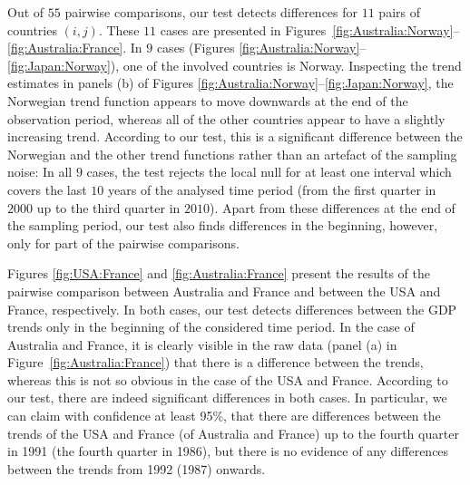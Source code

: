 \documentclass[a4paper,12pt]{article}
\begin{document}
Out of $55$ pairwise comparisons, our test detects differences for $11$ pairs of countries $(i,j)$. These $11$ cases are presented in Figures~\ref{fig:Australia:Norway}--\ref{fig:Australia:France}. In $9$ cases (Figures \ref{fig:Australia:Norway}--\ref{fig:Japan:Norway}), one of the involved countries is Norway. Inspecting the trend estimates in panels (b) of Figures \ref{fig:Australia:Norway}--\ref{fig:Japan:Norway}, the Norwegian trend function appears to move downwards at the end of the observation period, whereas all of the other countries appear to have a slightly increasing trend. According to our test, this is a significant difference between the Norwegian and the other trend functions rather than an artefact of the sampling noise: In all $9$ cases, the test rejects the local null for at least one interval which covers the last $10$ years of the analysed time period (from the first quarter in $2000$ up to the third quarter in $2010$). Apart from these differences at the end of the sampling period, our test also finds differences in the beginning, however, only for part of the pairwise comparisons. 




Figures \ref{fig:USA:France} and \ref{fig:Australia:France} present the results of the pairwise comparison between Australia and France and between the USA and France, respectively. In both cases, our test detects differences between the GDP trends only in the beginning of the considered time period. In the case of Australia and France, it is clearly visible in the raw data (panel (a) in Figure~\ref{fig:Australia:France}) that there is a difference between the trends, whereas this is not so obvious in the case of the USA and France. According to our test, there are indeed significant differences in both cases. In particular, we can claim with confidence at least 95\%, that there are differences between the trends of the USA and France (of Australia and France) up to the fourth quarter in 1991 (the fourth quarter in 1986), but there is no evidence of any differences between the trends from 1992 (1987) onwards.
\end{document}
